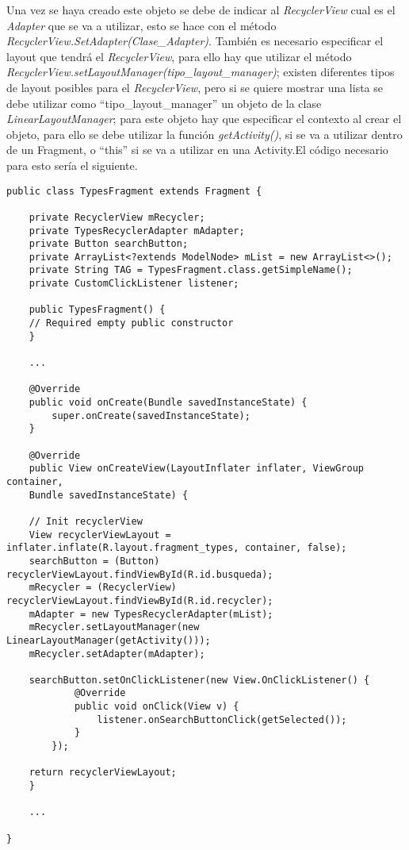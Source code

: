 Una vez se haya creado este objeto se debe de indicar al \textit{RecyclerView} cual es el \textit{Adapter} que se va a utilizar, esto se hace con el método \textit{RecyclerView.SetAdapter(Clase\_Adapter)}. También es necesario especificar el layout que tendrá el \textit{RecyclerView}, para ello hay que utilizar el método \textit{RecyclerView.setLayoutManager(tipo\_layout\_manager)}; existen diferentes tipos de layout posibles para el \textit{RecyclerView}, pero si se quiere mostrar una lista se debe utilizar como \enquote{tipo\_layout\_manager} un objeto de la clase \textit{LinearLayoutManager}; para este objeto hay que especificar el contexto al crear el objeto, para ello se debe utilizar la función \textit{getActivity()}, si se va a utilizar dentro de un Fragment, o \enquote{this} si se va a utilizar en una Activity.El código necesario para esto sería el siguiente.

\begin{lstlisting}[caption=Código de una clase que contiene un RecyclerView]
public class TypesFragment extends Fragment {

	private RecyclerView mRecycler;
	private TypesRecyclerAdapter mAdapter;
	private Button searchButton;
	private ArrayList<?extends ModelNode> mList = new ArrayList<>();
	private String TAG = TypesFragment.class.getSimpleName();
	private CustomClickListener listener;
	
	public TypesFragment() {
	// Required empty public constructor
	}
	
	...
	
	@Override
	public void onCreate(Bundle savedInstanceState) {
		super.onCreate(savedInstanceState);
	}
	
	@Override
	public View onCreateView(LayoutInflater inflater, ViewGroup container,
	Bundle savedInstanceState) {
	
	// Init recyclerView
	View recyclerViewLayout = inflater.inflate(R.layout.fragment_types, container, false);
	searchButton = (Button) recyclerViewLayout.findViewById(R.id.busqueda);
	mRecycler = (RecyclerView) recyclerViewLayout.findViewById(R.id.recycler);
	mAdapter = new TypesRecyclerAdapter(mList);
	mRecycler.setLayoutManager(new LinearLayoutManager(getActivity()));
	mRecycler.setAdapter(mAdapter);
	
	searchButton.setOnClickListener(new View.OnClickListener() {
			@Override
			public void onClick(View v) {
				listener.onSearchButtonClick(getSelected());
			}
		});
	
	return recyclerViewLayout;
	}
		
	...

}
\end{lstlisting}

